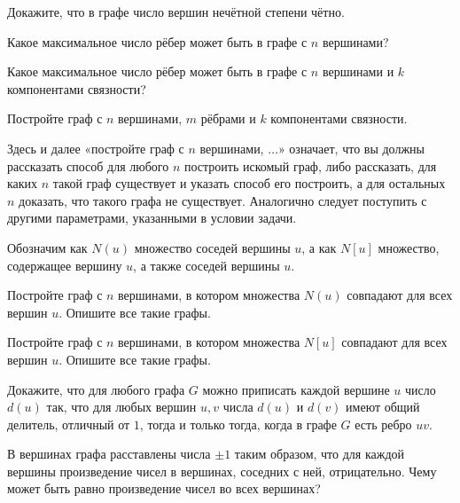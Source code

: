 

\ifPDFTeX
  \renewcommand{\rmdefault}{cmr}
\fi

\def\SheetNo{7}




\begin{problems}

\item
\begin{parts}
  \item Докажите, что в графе число вершин нечётной степени чётно.
  \item Какое максимальное число рёбер может быть в графе с $n$ вершинами?
  \item Какое максимальное число рёбер может быть в графе с $n$ вершинами и $k$ компонентами связности?
\end{parts}

\item Постройте граф с $n$ вершинами, $m$ рёбрами и $k$ компонентами связности.
\par Здесь и далее «постройте граф с $n$ вершинами, $\ldots$» означает, что вы должны рассказать способ для любого $n$ построить искомый граф, либо рассказать, для каких $n$ такой граф существует и указать способ его построить, а для остальных $n$ доказать, что такого графа не существует. Аналогично следует поступить с другими параметрами, указанными в условии задачи.

\item Обозначим как $N(u)$ множество соседей вершины $u$, а как $N[u]$ множество, содержащее вершину $u$, а также соседей вершины $u$.
\begin{parts}
  \item Постройте граф с $n$ вершинами, в котором множества $N(u)$ совпадают для всех вершин $u$. Опишите все такие графы.
  \item Постройте граф с $n$ вершинами, в котором множества $N[u]$ совпадают для всех вершин $u$. Опишите все такие графы.
\end{parts}

\item Докажите, что для любого графа $G$ можно приписать каждой вершине $u$ число $d(u)$ так, что для любых вершин $u,v$ числа $d(u)$ и $d(v)$ имеют общий делитель, отличный от $1$, тогда и только тогда, когда в графе $G$ есть ребро $uv$.

\item В вершинах графа расставлены числа $\pm1$ таким образом, что для каждой вершины произведение чисел в вершинах, соседних с ней, отрицательно. Чему может быть равно произведение чисел во всех вершинах?


\end{problems}
